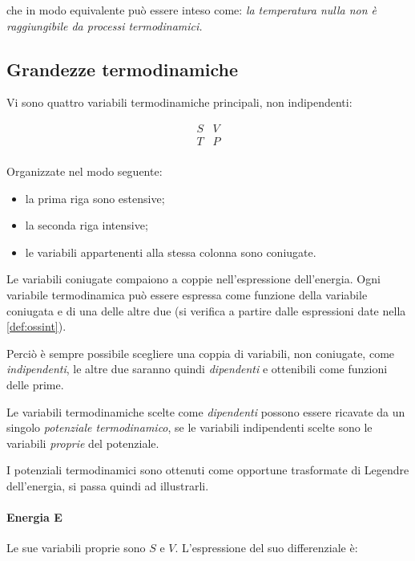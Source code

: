 \noindent che in modo equivalente può essere inteso come: \textit{la temperatura nulla non è raggiungibile da processi termodinamici.}

\subsection{Grandezze termodinamiche}
\label{sec:thermquant}

Vi sono quattro variabili termodinamiche principali, non indipendenti:

\begin{equation*}
\begin{matrix}
S	&	V \\
T	&	P \\
\end{matrix}
\end{equation*}

\noindent Organizzate nel modo seguente:
\begin{itemize}
	\item la prima riga sono estensive;
	\item la seconda riga intensive;
	\item le variabili appartenenti alla stessa colonna sono coniugate.
\end{itemize}

\noindent Le variabili coniugate compaiono a coppie nell'espressione dell'energia. Ogni variabile termodinamica può essere espressa come funzione della variabile coniugata e di una delle altre due (si verifica a partire dalle espressioni date nella \cref{def:ossint}).

Perciò è sempre possibile scegliere una coppia di variabili, non coniugate, come \textit{indipendenti}, le altre due saranno quindi \textit{dipendenti} e ottenibili come funzioni delle prime.
\newline

Le variabili termodinamiche scelte come \textit{dipendenti} possono essere ricavate da un singolo \textit{potenziale termodinamico}, se le variabili indipendenti scelte sono le variabili \textit{proprie} del potenziale.

I potenziali termodinamici sono ottenuti come opportune trasformate di Legendre dell'energia, si passa quindi ad illustrarli.

\paragraph{Energia E} Le sue variabili proprie sono $S$ e $V$. L'espressione del suo differenziale è:

